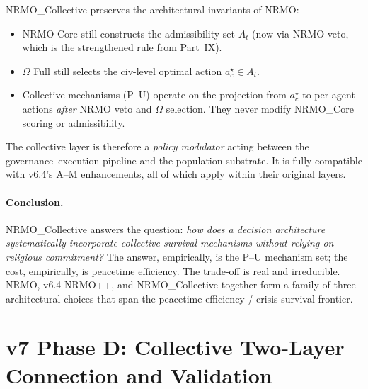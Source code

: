 NRMO\_Collective preserves the architectural invariants of NRMO:
\begin{itemize}
\item NRMO Core still constructs the admissibility set
  $A_t$ (now via NRMO veto, which is the strengthened rule from
  Part~IX).
\item $\Omega$ Full still selects the civ-level optimal action
  $a^\star_c \in A_t$.
\item Collective mechanisms (P--U) operate on the projection from
  $a^\star_c$ to per-agent actions \emph{after} NRMO veto and $\Omega$
  selection. They never modify NRMO\_Core scoring or admissibility.
\end{itemize}

The collective layer is therefore a \emph{policy modulator} acting
between the governance--execution pipeline and the population
substrate. It is fully compatible with v6.4's A--M enhancements,
all of which apply within their original layers.

\paragraph{Conclusion.}
NRMO\_Collective answers the question: \emph{how does a decision
architecture systematically incorporate collective-survival
mechanisms without relying on religious commitment?} The answer,
empirically, is the P--U mechanism set; the cost, empirically, is
peacetime efficiency. The trade-off is real and irreducible. NRMO,
v6.4 NRMO++, and NRMO\_Collective together form a family of three
architectural choices that span the
peacetime-efficiency / crisis-survival frontier.

\section{v7 Phase D: Collective Two-Layer Connection and Validation}
\label{sec:collective-v7-phase-d}


